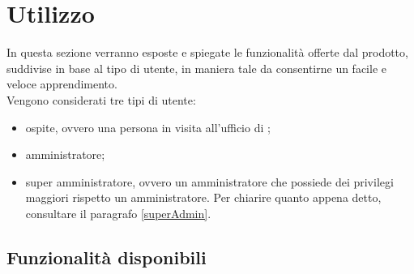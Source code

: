 \section{Utilizzo}
In questa sezione verranno esposte e spiegate le funzionalità offerte dal prodotto, suddivise in base al tipo di utente, in maniera tale da consentirne un facile e veloce apprendimento. \\
Vengono considerati tre tipi di utente:
\begin{itemize}
	\item ospite, ovvero una persona in visita all'ufficio di \PROPONENTE;
	\item amministratore;
	\item super amministratore, ovvero un amministratore che possiede dei privilegi maggiori rispetto un amministratore. Per chiarire quanto appena detto, consultare il paragrafo \ref{superAdmin}.
\end{itemize}
 
\subsection{Funzionalità disponibili}\label{funz}
